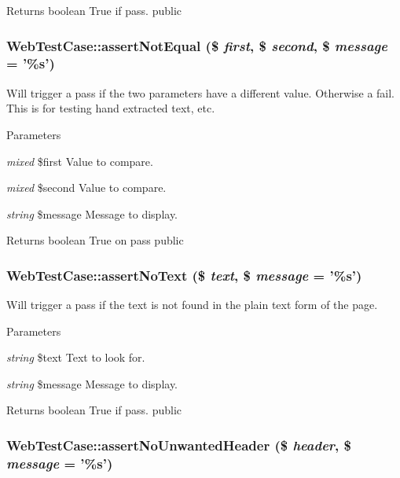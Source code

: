 \begin{DoxyReturn}{Returns}
boolean True if pass.  public 
\end{DoxyReturn}
\hypertarget{class_web_test_case_a09e9b91f3e29ff7f36be218413238f73}{
\subsubsection[{assertNotEqual}]{\setlength{\rightskip}{0pt plus 5cm}WebTestCase::assertNotEqual (\$ {\em first}, \/  \$ {\em second}, \/  \$ {\em message} = {\ttfamily '\%s'})}}
\label{class_web_test_case_a09e9b91f3e29ff7f36be218413238f73}
Will trigger a pass if the two parameters have a different value. Otherwise a fail. This is for testing hand extracted text, etc. 
\begin{DoxyParams}{Parameters}
\item[{\em mixed}]\$first Value to compare. \item[{\em mixed}]\$second Value to compare. \item[{\em string}]\$message Message to display. \end{DoxyParams}
\begin{DoxyReturn}{Returns}
boolean True on pass  public 
\end{DoxyReturn}
\hypertarget{class_web_test_case_a1a2b021f72bbc8ec114df0558b882bf6}{
\subsubsection[{assertNoText}]{\setlength{\rightskip}{0pt plus 5cm}WebTestCase::assertNoText (\$ {\em text}, \/  \$ {\em message} = {\ttfamily '\%s'})}}
\label{class_web_test_case_a1a2b021f72bbc8ec114df0558b882bf6}
Will trigger a pass if the text is not found in the plain text form of the page. 
\begin{DoxyParams}{Parameters}
\item[{\em string}]\$text Text to look for. \item[{\em string}]\$message Message to display. \end{DoxyParams}
\begin{DoxyReturn}{Returns}
boolean True if pass.  public 
\end{DoxyReturn}
\hypertarget{class_web_test_case_aa12793f1d62d25ae5748063e26a9a513}{
\subsubsection[{assertNoUnwantedHeader}]{\setlength{\rightskip}{0pt plus 5cm}WebTestCase::assertNoUnwantedHeader (\$ {\em header}, \/  \$ {\em message} = {\ttfamily '\%s'})}}
